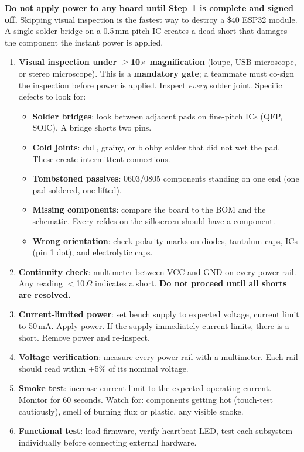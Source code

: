 \documentclass[11pt,letterpaper,twoside,openany]{book}
\begin{document}
\begin{warningbox}
\textbf{Do not apply power to any board until Step~1 is complete and signed off.} Skipping visual inspection is the fastest way to destroy a \$40 ESP32 module. A single solder bridge on a 0.5\,mm-pitch IC creates a dead short that damages the component the instant power is applied.
\end{warningbox}

\begin{enumerate}[leftmargin=1.5em]
\item \textbf{Visual inspection under $\geq$10$\times$ magnification} (loupe, USB microscope, or stereo microscope). This is a \textbf{mandatory gate}; a teammate must co-sign the inspection before power is applied. Inspect \emph{every} solder joint. Specific defects to look for:
\begin{itemize}[nosep,leftmargin=1.5em]
\item \textbf{Solder bridges}: look between adjacent pads on fine-pitch ICs (QFP, SOIC). A bridge shorts two pins.
\item \textbf{Cold joints}: dull, grainy, or blobby solder that did not wet the pad. These create intermittent connections.
\item \textbf{Tombstoned passives}: 0603/0805 components standing on one end (one pad soldered, one lifted).
\item \textbf{Missing components}: compare the board to the BOM and the schematic. Every refdes on the silkscreen should have a component.
\item \textbf{Wrong orientation}: check polarity marks on diodes, tantalum caps, ICs (pin 1 dot), and electrolytic caps.
\end{itemize}
\item \textbf{Continuity check}: multimeter between VCC and GND on every power rail. Any reading $<$10\,$\Omega$ indicates a short. \textbf{Do not proceed until all shorts are resolved.}
\item \textbf{Current-limited power}: set bench supply to expected voltage, current limit to 50\,mA. Apply power. If the supply immediately current-limits, there is a short. Remove power and re-inspect.
\item \textbf{Voltage verification}: measure every power rail with a multimeter. Each rail should read within $\pm$5\% of its nominal voltage.
\item \textbf{Smoke test}: increase current limit to the expected operating current. Monitor for 60 seconds. Watch for: components getting hot (touch-test cautiously), smell of burning flux or plastic, any visible smoke.
\item \textbf{Functional test}: load firmware, verify heartbeat LED, test each subsystem individually before connecting external hardware.
\end{enumerate}
\end{document}
